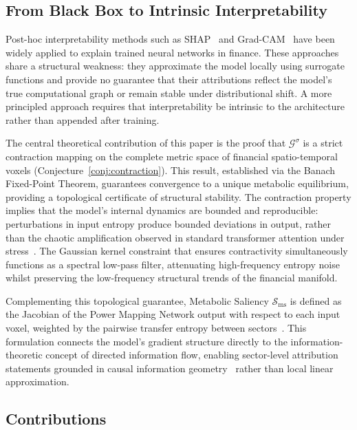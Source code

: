 \documentclass[11pt,a4paper]{article}  %
\newcommand{\Gop}{\mathcal{G}^{\sigma}}
\newcommand{\Ssal}{\mathcal{S}_{\mathrm{ms}}}
\theoremstyle{plain}
\theoremstyle{definition}
\theoremstyle{remark}
\begin{document}
\subsection{From Black Box to Intrinsic Interpretability}
\label{subsec:interpretability_intro}

Post-hoc interpretability methods such as SHAP~\cite{Lundberg2017} and
Grad-CAM~\cite{Selvaraju2020} have been widely applied to explain
trained neural networks in finance. These approaches share a structural
weakness: they approximate the model locally using surrogate functions
and provide no guarantee that their attributions reflect the model's
true computational graph or remain stable under distributional shift.
A more principled approach requires that interpretability be intrinsic
to the architecture rather than appended after training.

The central theoretical contribution of this paper is the proof that
$\Gop$ is a strict contraction mapping on the complete metric space of
financial spatio-temporal voxels (Conjecture~\ref{conj:contraction}). This
result, established via the Banach Fixed-Point Theorem, guarantees
convergence to a unique metabolic equilibrium, providing a topological
certificate of structural stability. The contraction property implies
that the model's internal dynamics are bounded and reproducible:
perturbations in input entropy produce bounded deviations in output,
rather than the chaotic amplification observed in standard transformer
attention under stress~\cite{Dehghani2023}. The Gaussian kernel
constraint that ensures contractivity simultaneously functions as a
spectral low-pass filter, attenuating high-frequency entropy noise
whilst preserving the low-frequency structural trends of the financial
manifold.

Complementing this topological guarantee, Metabolic Saliency
$\Ssal$ is defined as the Jacobian of the Power Mapping Network output
with respect to each input voxel, weighted by the pairwise transfer
entropy between sectors~\cite{Schreiber2000}. This formulation connects
the model's gradient structure directly to the information-theoretic
concept of directed information flow, enabling sector-level attribution
statements grounded in causal information geometry~\cite{Amari2016}
rather than local linear approximation.

\subsection{Contributions}
\label{subsec:contrib}
\end{document}
